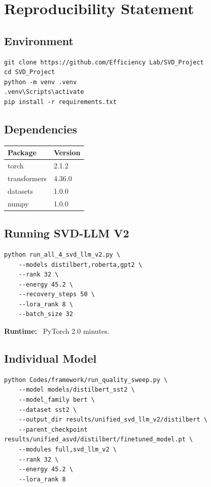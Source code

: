 
\section{Reproducibility Statement}

\subsection{Environment}

\begin{lstlisting}
git clone https://github.com/Efficiency Lab/SVD_Project
cd SVD_Project
python -m venv .venv
.venv\Scripts\activate
pip install -r requirements.txt
\end{lstlisting}

\subsection{Dependencies}

\begin{table}[H]
\centering
\small
\begin{tabular}{ll}
\toprule
\textbf{Package} & \textbf{Version} \\
\midrule
torch & 2.1.2 \\
transformers & 4.36.0 \\
datasets & 1.0.0 \\
numpy & 1.0.0 \\
\bottomrule
\end{tabular}
\end{table}

\subsection{Running SVD-LLM V2}

\begin{lstlisting}
python run_all_4_svd_llm_v2.py \
    --models distilbert,roberta,gpt2 \
    --rank 32 \
    --energy 45.2 \
    --recovery_steps 50 \
    --lora_rank 8 \
    --batch_size 32
\end{lstlisting}

\textbf{Runtime:} ~PyTorch 2.0 minutes.

\subsection{Individual Model}

\begin{lstlisting}
python Codes/framework/run_quality_sweep.py \
    --model models/distilbert_sst2 \
    --model_family bert \
    --dataset sst2 \
    --output_dir results/unified_svd_llm_v2/distilbert \
    --parent_checkpoint results/unified_asvd/distilbert/finetuned_model.pt \
    --modules full,svd_llm_v2 \
    --rank 32 \
    --energy 45.2 \
    --lora_rank 8
\end{lstlisting}


